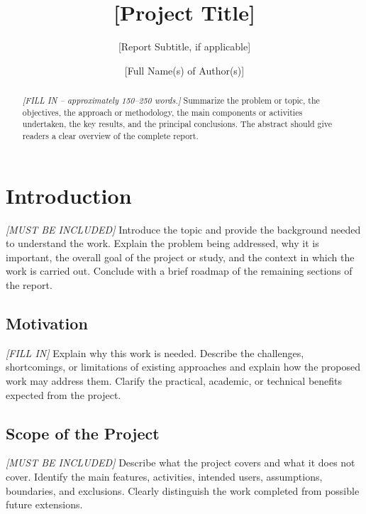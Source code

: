 \documentclass[manuscript,screen,review]{acmart}
\begin{document}
\title{[Project Title]}
\subtitle{[Report Subtitle, if applicable]}

\author{[Full Name(s) of Author(s)]}

\renewcommand{\shortauthors}{[Author Surname(s)]}

\begin{abstract}
\textit{[FILL IN -- approximately 150--250 words.]}
Summarize the problem or topic, the objectives, the approach or
methodology, the main components or activities undertaken, the key
results, and the principal conclusions. The abstract should give
readers a clear overview of the complete report.
\end{abstract}


\maketitle

\section{Introduction}
\label{sec:intro}
\textit{[MUST BE INCLUDED]}
Introduce the topic and provide the background needed to understand
the work. Explain the problem being addressed, why it is important,
the overall goal of the project or study, and the context in which
the work is carried out. Conclude with a brief roadmap of the
remaining sections of the report.

\subsection{Motivation}
\textit{[FILL IN]}
Explain why this work is needed. Describe the challenges, shortcomings,
or limitations of existing approaches and explain how the proposed
work may address them. Clarify the practical, academic, or technical
benefits expected from the project.

\subsection{Scope of the Project}
\textit{[MUST BE INCLUDED]}
Describe what the project covers and what it does not cover. Identify
the main features, activities, intended users, assumptions, boundaries,
and exclusions. Clearly distinguish the work completed from possible
future extensions.
\end{document}
